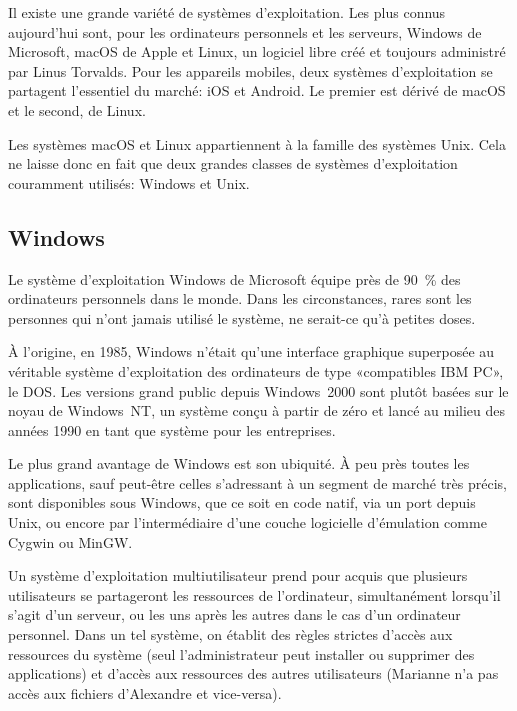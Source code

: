 Il existe une grande variété de systèmes d'exploitation. Les plus
connus aujourd'hui sont, pour les ordinateurs personnels et les
serveurs, Windows de Microsoft, macOS de
Apple et Linux, un logiciel libre créé et toujours
administré par Linus Torvalds. Pour les appareils mobiles, deux
systèmes d'exploitation se partagent l'essentiel du marché: iOS et
Android. Le premier est dérivé de macOS et le second, de Linux.

Les systèmes macOS et Linux appartiennent à
la famille des systèmes Unix. Cela ne laisse donc en fait
que deux grandes classes de systèmes d'exploitation couramment
utilisés: Windows et Unix.

\subsection{Windows}
\label{sec:informatique:os:windows}

Le système d'exploitation Windows de Microsoft équipe
près de 90~\% des ordinateurs personnels dans le monde. Dans les
circonstances, rares sont les personnes qui n'ont jamais utilisé le
système, ne serait-ce qu'à petites doses.

À l'origine, en 1985, Windows n'était qu'une interface
graphique superposée au véritable système d'exploitation des
ordinateurs de type «compatibles IBM PC», le DOS. Les versions grand
public depuis Windows~2000 sont plutôt basées sur le noyau de
Windows~NT, un système conçu à partir de zéro et lancé au milieu des
années 1990 en tant que système pour les entreprises.

Le plus grand avantage de Windows est son ubiquité. À
peu près toutes les applications, sauf peut-être celles s'adressant à
un segment de marché très précis, sont disponibles sous Windows, que
ce soit en code natif, via un port depuis Unix, ou encore
par l'intermédiaire d'une couche logicielle d'émulation comme Cygwin
ou MinGW.

Un système d'exploitation multiutilisateur prend pour acquis que
plusieurs utilisateurs se partageront les ressources de l'ordinateur,
simultanément lorsqu'il s'agit d'un serveur, ou les uns après les
autres dans le cas d'un ordinateur personnel. Dans un tel système, on
établit des règles strictes d'accès aux ressources du système (seul
l'administrateur peut installer ou supprimer des applications) et
d'accès aux ressources des autres utilisateurs (Marianne n'a pas
accès aux fichiers d'Alexandre et vice-versa).

